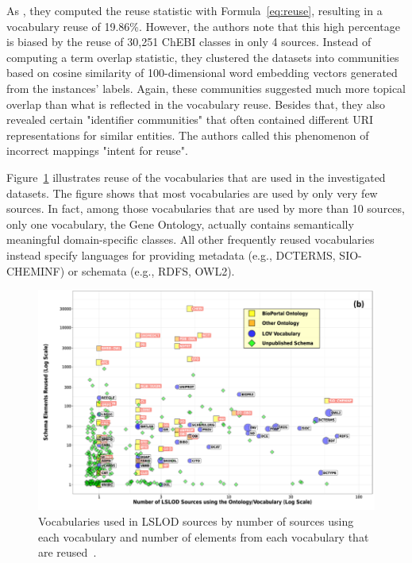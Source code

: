 \documentclass[runningheads]{llncs}
\begin{document}
    As \citet{kamdar2017systematic}, they computed the reuse statistic with Formula~\ref{eq:reuse}, resulting in a vocabulary reuse of 19.86\%.
    However, the authors note that this high percentage is biased by the reuse of 30,251 ChEBI classes in only 4 sources.
    Instead of computing a term overlap statistic, they clustered the datasets into communities based on cosine similarity of 100-dimensional word embedding vectors generated from the instances' labels.
    Again, these communities suggested much more topical overlap than what is reflected in the vocabulary reuse.
    Besides that, they also revealed certain "identifier communities" that often contained different URI representations for similar entities.
    The authors called this phenomenon of incorrect mappings "intent for reuse".

    Figure~\ref{fig:vocabulary_reuse} illustrates reuse of the vocabularies that are used in the investigated datasets.
    The figure shows that most vocabularies are used by only very few sources.
    In fact, among those vocabularies that are used by more than 10 sources, only one vocabulary, the Gene Ontology, actually contains semantically meaningful domain-specific classes.
    All other frequently reused vocabularies instead specify languages for providing metadata (e.g., DCTERMS, SIO-CHEMINF) or schemata (e.g., RDFS, OWL2).

    \begin{figure}[ht]
        \centering
        \includegraphics[width=\textwidth]{figures/vocabulary-reuse}
        \caption{Vocabularies used in LSLOD sources by number of sources using each vocabulary and number of elements from each vocabulary that are reused~\citep{kamdar2021empirical}.}
        \label{fig:vocabulary_reuse}
    \end{figure}
\end{document}
